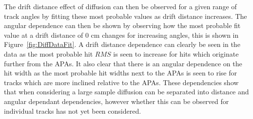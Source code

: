The drift distance effect of diffusion can then be observed for a given range of track angles by fitting these most probable values as drift distance increases. The angular dependence can then be shown by observing how the most probable fit value at a drift distance of 0 cm changes for increasing angles, this is shown in Figure~\ref{fig:DiffDataFit}. A drift distance dependence can clearly be seen in the data as the most probable hit $RMS$ is seen to increase for hits which originate further from the APAs. It also clear that there is an angular dependence on the hit width as the most probable hit widths next to the APAs is seen to rise for tracks which are more inclined relative to the APAs. These dependencies show that when considering a large sample diffusion can be separated into distance and angular dependant dependencies, however whether this can be observed for individual tracks has not yet been considered. \\

